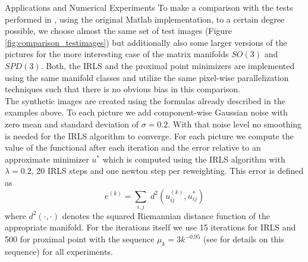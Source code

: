 \begin{chapter}{Applications and Numerical Experiments}
To make a comparison with the tests performed in \cite{SprecherIRLS}, using the original Matlab implementation, to a certain degree possible, we choose 
almost the same set of test images (Figure \ref{fig:comparison_testimages}) but additionally also some larger versions of the pictures for the more interesting 
case of the matrix manifolds $SO(3)$ and $SPD(3)$. Both, the IRLS and the proximal point minimizers are implemented using the same manifold classes and utilize the
same pixel-wise parallelization techniques such that there is no obvious bias in this comparison.\\

The synthetic images are created using the formulas already described in the examples above. To each picture we add component-wise Gaussian noise with zero mean and
standard deviation of $\sigma=0.2$. With that noise level no smoothing is needed for the IRLS algorithm to converge. 
For each picture we compute the value of the functional after each iteration and the error relative to an approximate minimizer $u^*$
which is computed using the IRLS algorithm with $\lambda=0.2$, 20 IRLS steps and one newton step per reweighting. This error is defined as
\begin{equation}
e^{(k)}=\sum_{i,j}\;d^2(u^{(k)}_{ij},u^*_{ij})
\end{equation}
where $d^2(\cdot,\cdot)$ denotes the squared Riemannian distance function of the appropriate manifold. For the iterations itself we use 15 iterations for IRLS and 500 for proximal point with
the sequence $\mu_k=3k^{-0.95}$ (see \cite{Weinmann} for details on this sequence) for all experiments. \\


\end{chapter}
